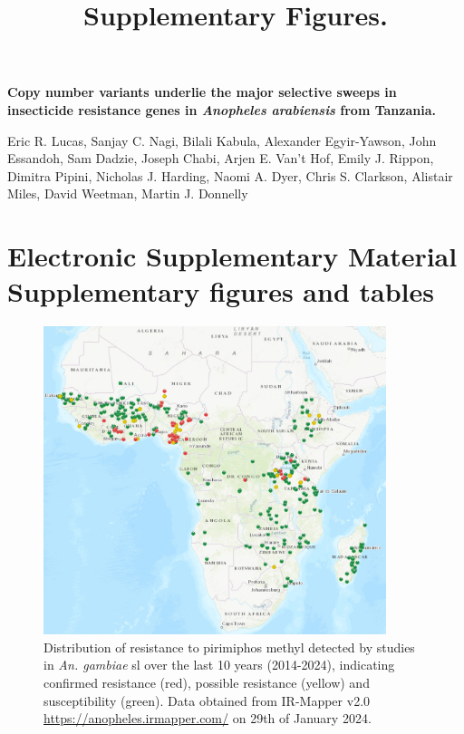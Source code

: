 \documentclass[a4paper,12pt]{article}
\title{Supplementary Figures.}
\begin{document}
\onehalfspacing

\begin{center}
	\Large
	\noindent \textbf{Copy number variants underlie the major selective sweeps in insecticide resistance genes in \textit{Anopheles arabiensis} from Tanzania.}

	\normalsize

	\vskip 3cm

\end{center}

\noindent Eric R. Lucas, Sanjay C. Nagi, Bilali Kabula, Alexander Egyir-Yawson, John Essandoh, Sam Dadzie, Joseph Chabi, Arjen E. Van’t Hof, Emily J. Rippon, Dimitra Pipini, Nicholas J. Harding, Naomi A. Dyer, Chris S. Clarkson, Alistair Miles, David Weetman, Martin J. Donnelly 

 
\vskip 2cm 


\section*{Electronic Supplementary Material \\ Supplementary figures and tables}

\clearpage


\begin{figure}[h]
	\begin{center}
	\vskip 7cm
	\includegraphics*[width = 10cm]{./Anopheles_PM_resistance_map.png}
	\caption{\footnotesize Distribution of resistance to pirimiphos methyl detected by studies in \textit{An. gambiae} sl over the last 10 years (2014-2024), indicating confirmed resistance (red), possible resistance (yellow) and susceptibility (green). Data obtained from IR-Mapper v2.0 \url{https://anopheles.irmapper.com/} on 29th of January 2024.}
	\end{center}
	\label{FigS1}
\end{figure}
\end{document}
